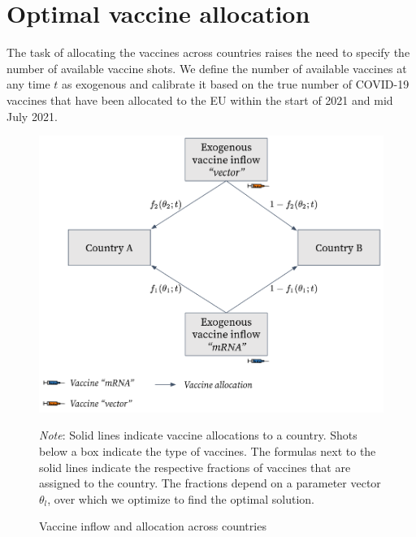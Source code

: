 \clearpage
\section{Optimal vaccine allocation}\label{sec:vaccine_allocation}
The task of allocating the vaccines across countries raises the need to specify the number of available vaccine shots. We define the number of available vaccines at any time $t$ as exogenous and calibrate it based on the true number of COVID-19 vaccines that have been allocated to the EU within the start of 2021 and mid July 2021.
\begin{figure}[h!]
\centering
\includegraphics[scale=0.3]{images/overview_vaccine_inflow.png}\\
\begin{flushleft}
\scriptsize{\textit{Note}: Solid lines indicate vaccine allocations to a country. Shots below a box indicate the type of vaccines. The formulas next to the solid lines indicate the respective fractions of vaccines that are assigned to the country. The fractions depend on a parameter vector $\theta_l$, over which we optimize to find the optimal solution.}
\end{flushleft}
\caption{Vaccine inflow and allocation across countries}
\label{fig:model_vaccine_allocation}
\end{figure}

